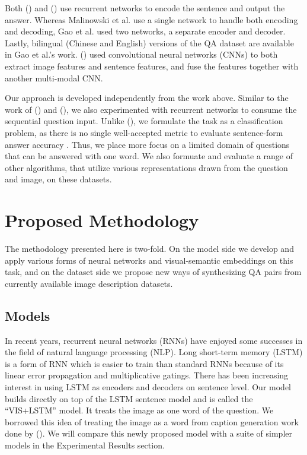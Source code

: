 \documentclass{article}
\renewcommand{\#}[1]{\textbf{#1}}
\newcommand{\shortcite}[1]{\citeauthor{#1} (\citeyear{#1})}
\begin{document}
Both \shortcite{malinowski15} and \shortcite{gao15} 
use recurrent networks to encode the 
sentence and output the answer. Whereas Malinowski et al. use a single 
network to handle both encoding and decoding, Gao et al. used two networks,
a separate encoder and decoder. Lastly, bilingual (Chinese and English) 
versions of the QA dataset are available in Gao et al.'s work. 
\shortcite{ma15} used convolutional neural networks (CNNs) 
to both extract image 
features and sentence features, and fuse the features together with another 
multi-modal CNN. 

Our approach is developed independently from the work above. 
Similar to the work of \shortcite{malinowski15}
and \shortcite{gao15}, we also experimented with recurrent 
networks to consume the sequential question input. Unlike \shortcite{gao15},
we formulate the task as a classification problem, as there is no
single well-accepted metric to evaluate sentence-form answer accuracy \cite{chen15}.
Thus, we place more focus on a limited domain of questions that 
can be answered with one word. We also formuate and evaluate a
range of other algorithms, that utilize various representations
drawn from the question and image, on these datasets.

\section{Proposed Methodology}
The methodology presented here is two-fold. On the model side we develop and apply
various forms of neural networks and visual-semantic embeddings on this task,
and on the dataset  side we propose new ways of synthesizing QA pairs from
currently available image description datasets.

\subsection{Models}
In recent years, recurrent neural networks (RNNs) have enjoyed some successes in 
the field of natural language processing (NLP). Long short-term memory
(LSTM) \cite{hochreiter97} is a form of RNN which is easier to train than standard 
RNNs because of its linear error propagation and multiplicative gatings. There has 
been increasing interest in using LSTM as encoders and decoders on sentence level. 
Our model builds directly on top of the LSTM sentence model and is called the 
``VIS+LSTM'' model. It treats the image as one word of the question. We borrowed 
this idea of treating the image as a word from caption generation work done by 
\shortcite{vinyals14}. We will compare this newly proposed model with a suite of simpler models in the Experimental Results section.
\end{document}
